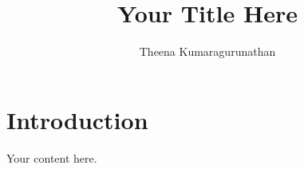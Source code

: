 \documentclass{article}
\begin{document}
\title{Your Title Here}
\author{Theena Kumaragurunathan}
\maketitle

\section{Introduction}
Your content here.
\end{document}
